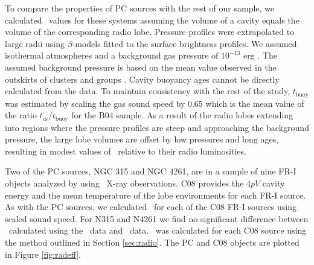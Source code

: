 \documentclass[12pt, preprint]{aastex}
\begin{document}
To compare the properties of PC sources with the rest of our sample,
we calculated \pcav\ values for these systems assuming the volume of a
cavity equals the volume of the corresponding radio lobe. Pressure
profiles were extrapolated to large radii using $\beta$-models
\citep{betamodel} fitted to the surface brightness profiles. We
assumed isothermal atmospheres and a background gas pressure of
$10^{-13}$ erg \pcc. The assumed background pressure is based on the
mean value observed in the outskirts of clusters and groups
\citep{accept}. Cavity buoyancy ages cannot be directly calculated
from the data. To maintain consistency with the rest of the study,
$t_{\mathrm{buoy}}$ was estimated by scaling the gas sound speed by
0.65 which is the mean value of the ratio
$t_{\mathrm{cs}}/t_{\mathrm{buoy}}$ for the B04 sample. As a result of
the radio lobes extending into regions where the pressure profiles are
steep and approaching the background pressure, the large lobe volumes
are offset by low pressures and long ages, resulting in modest values
of \pcav\ relative to their radio luminosities.

Two of the PC sources, NGC 315 and NGC 4261, are in a sample of nine
FR-I objects analyzed by \citet[][hereafter C08]{2008MNRAS.386.1709C}
using \xmm\ X-ray observations. C08 provides the $4pV$ cavity energy
and the mean temperature of the lobe environments for each FR-I
source. As with the PC sources, we calculated \pcav\ for each of the
C08 FR-I sources using scaled sound speed. For N315 and N4261 we find
no significant difference between \pcav\ calculated using the
\chandra\ data and \xmm\ data. \phigh\ was calculated for each C08
source using the method outlined in Section \ref{sec:radio}. The PC
and C08 objects are plotted in Figure \ref{fig:radeff}.
\end{document}
